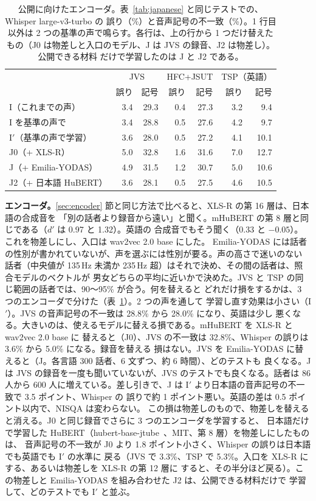 \documentclass[10pt,a4paper,twocolumn]{article}
\begin{document}
\begin{table}[t]
\centering\footnotesize\setlength{\tabcolsep}{2.1pt}
\caption{公開に向けたエンコーダ。表~\ref{tab:japanese} と同じテストでの、Whisper large-v3-turbo の
誤り（\%）と音声記号の不一致（\%）。1 行目以外は 2 つの基準の声で鳴らす。各行は、上の行から
1 つだけ替えたもの（J0 は物差しと入口のモデル、J は JVS の録音、J2 は物差し）。公開できる材料
だけで学習したのは J と J2 である。}
\label{tab:release}
\begin{tabular}{@{}lrrrrrr@{}}
\toprule
& \multicolumn{2}{c}{JVS} & \multicolumn{2}{c}{HFC+JSUT} & \multicolumn{2}{c}{TSP（英語）}\\
& 誤り & 記号 & 誤り & 記号 & 誤り & 記号\\
\midrule
I（これまでの声） & 3.4 & 29.3 & 0.4 & 27.3 & 3.2 & 9.4\\
I を基準の声で & 3.4 & 28.8 & 0.5 & 27.6 & 4.2 & 9.7\\
I$'$（基準の声で学習） & 3.6 & 28.0 & 0.5 & 27.2 & 4.1 & 10.1\\
J0（+ XLS-R） & 5.0 & 32.8 & 1.6 & 31.6 & 7.0 & 12.7\\
J（+ Emilia-YODAS） & 4.9 & 31.5 & 1.2 & 30.7 & 5.0 & 10.6\\
J2（+ 日本語 HuBERT） & 3.6 & 28.1 & 0.5 & 27.5 & 4.6 & 10.5\\
\bottomrule
\end{tabular}
\end{table}

\textbf{エンコーダ。}\ref{sec:encoder} 節と同じ方法で比べると、XLS-R の第 16 層は、日本語の合成音を
「別の話者より録音から遠い」と聞く。mHuBERT の第 8 層と同じである（$d'$ は 0.97 と 1.32）。英語の
合成音でもそう聞く（0.33 と $-0.05$）。これを物差しにし、入口は wav2vec 2.0 base にした。
Emilia-YODAS には話者の性別が書かれていないが、声を選ぶには性別が要る。声の高さで迷いのない
話者（中央値が 135\,Hz 未満か 235\,Hz 超）はそれで決め、その間の話者は、照合モデルのベクトルが
男女どちらの平均に近いかで決めた。JVS と TSP の同じ範囲の話者では、90〜95\% が合う。何を替えると
どれだけ損をするかは、3 つのエンコーダで分けた（表~\ref{tab:release}）。2 つの声を通して
学習し直す効果は小さい（I$'$）。JVS の音声記号の不一致は 28.8\% から 28.0\% になり、英語は少し
悪くなる。大きいのは、使えるモデルに替える損である。mHuBERT を XLS-R と wav2vec 2.0 base に
替えると（J0）、JVS の不一致は 32.8\%、Whisper の誤りは 3.6\% から 5.0\% になる。録音を替える
損はない。JVS を Emilia-YODAS に替えると（J。各言語 300 話者、6 文ずつ、約 6 時間）、どのテストも
良くなる。J は JVS の録音を一度も聞いていないが、JVS のテストでも良くなる。話者は 86 人から
600 人に増えている。差し引きで、J は I$'$ より日本語の音声記号の不一致で 3.5 ポイント、Whisper の
誤りで約 1 ポイント悪い。英語の差は 0.5 ポイント以内で、NISQA は変わらない。
この損は物差しのもので、物差しを替えると消える。J0 と同じ録音でさらに 3 つのエンコーダを学習すると、
日本語だけで学習した HuBERT（hubert-base-jtube~\cite{jtube}、MIT、第 8 層）を物差しにしたものは、
音声記号の不一致が J0 より 1.8 ポイント小さく、Whisper の誤りは日本語でも英語でも I$'$ の水準に
戻る（JVS で 3.3\%、TSP で 5.3\%。入口を XLS-R にする、あるいは物差しを XLS-R の第 12 層に
すると、その半分ほど戻る）。この物差しと Emilia-YODAS を組み合わせた J2 は、公開できる材料だけで
学習して、どのテストでも I$'$ と並ぶ。
\end{document}
